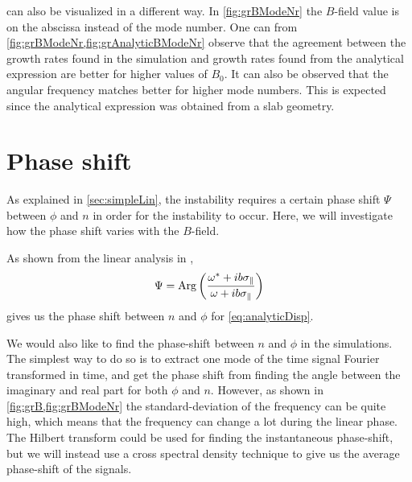 can also be visualized in a different way.
In \cref{fig:grBModeNr} the $B$-field value is on the abscissa instead of the mode number.
One can from \cref{fig:grBModeNr,fig:grAnalyticBModeNr} observe that the agreement between the growth rates found in the simulation and growth rates found from the analytical expression are better for higher values of $B_0$.
It can also be observed that the angular frequency matches better for higher mode numbers.
This is expected since the analytical expression was obtained from a slab geometry.

\section{Phase shift}
%
As explained in \ref{sec:simpleLin}, the instability requires a certain phase shift $\Psi$ between $\phi$ and $n$ in order for the instability to occur.
Here, we will investigate how the phase shift varies with the $B$-field.

As shown from the linear analysis in \cite{Pecseli2016book},
%
\begin{align}
    \Psi = \operatorname{Arg}\left( \frac{\omega^*+ib\sigma_\|}{\omega+ib\sigma_\|} \right)
    \label{eq:analPhase}
\end{align}
%
gives us the phase shift between $n$ and $\phi$ for \cref{eq:analyticDisp}.

We would also like to find the phase-shift between $n$ and $\phi$ in the simulations.
The simplest way to do so is to extract one mode of the time signal Fourier transformed in time, and get the phase shift from finding the angle between the imaginary and real part for both $\phi$ and $n$.
However, as shown in \cref{fig:grB,fig:grBModeNr} the standard-deviation of the frequency can be quite high, which means that the frequency can change a lot during the linear phase.
The Hilbert transform could be used for finding the instantaneous phase-shift, but we will instead use a cross spectral density technique to give us the average phase-shift of the signals.

